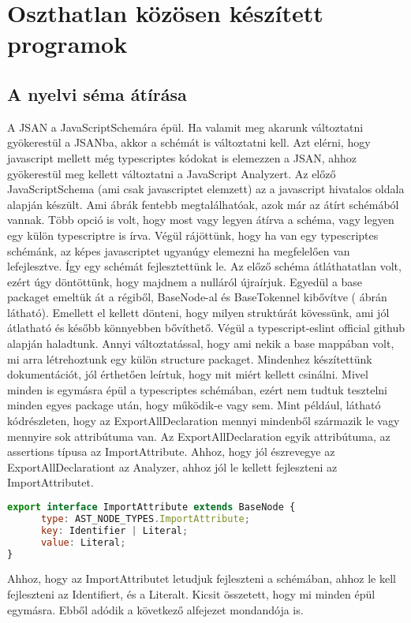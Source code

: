 \chapter{Oszthatlan közösen készített programok}\label{chap:oszthatlan_kozos_dolgok}

\section{A nyelvi séma átírása}

\noindent

A JSAN a JavaScriptSchemára épül. Ha valamit meg akarunk változtatni gyökerestül a JSANba, akkor a schémát is változtatni kell.
Azt elérni, hogy javascript mellett még typescriptes kódokat is elemezzen a JSAN, ahhoz gyökerestül meg kellett változtatni a JavaScript Analyzert.
Az előző JavaScriptSchema (ami csak javascriptet elemzett) az a javascript hivatalos oldala alapján készült. Ami ábrák fentebb megtalálhatóak, azok már az átírt schémából vannak.
Több opció is volt, hogy most vagy legyen átírva a schéma, vagy legyen egy külön typescriptre is írva.
Végül rájöttünk, hogy ha van egy typescriptes schémánk, az képes javascriptet ugyanúgy elemezni ha megfelelően van lefejlesztve.
Így egy schémát fejlesztettünk le. Az előző schéma átláthatatlan volt, ezért úgy döntöttünk, hogy majdnem a nulláról újraírjuk.
Egyedül a base packaget emeltük át a régiből, BaseNode-al és BaseTokennel kibővítve ( ábrán látható).
Emellett el kellett dönteni, hogy milyen struktúrát kövessünk, ami jól átlatható és később könnyebben bővíthető.
Végül a typescript-eslint official github alapján haladtunk. Annyi változtatással, hogy ami nekik a base mappában volt, mi arra létrehoztunk egy külön structure packaget.
Mindenhez készítettünk dokumentációt, jól érthetően leírtuk, hogy mit miért kellett csinálni.
Mivel minden is egymásra épül a typescriptes schémában, ezért nem tudtuk tesztelni minden egyes package után, hogy működik-e vagy sem.
Mint például, látható  kódrészleten, hogy az ExportAllDeclaration mennyi mindenből származik le vagy mennyire sok attribútuma van.
Az ExportAllDeclaration egyik attribútuma, az assertions típusa az ImportAttribute. Ahhoz, hogy jól észrevegye az ExportAllDeclarationt az Analyzer, ahhoz jól le kellett fejleszteni az ImportAttributet.

\begin{lstlisting}[caption={ImportAttribute},label={lst:asg_file_import_attribute}, language={JavaScript}]
export interface ImportAttribute extends BaseNode {
      type: AST_NODE_TYPES.ImportAttribute;
      key: Identifier | Literal;
      value: Literal;
}
\end{lstlisting}
Ahhoz, hogy az ImportAttributet letudjuk fejleszteni a schémában, ahhoz le kell fejleszteni az Identifiert, és a Literalt.
Kicsit összetett, hogy mi minden épül egymásra. Ebből adódik a következő alfejezet mondandója is.

